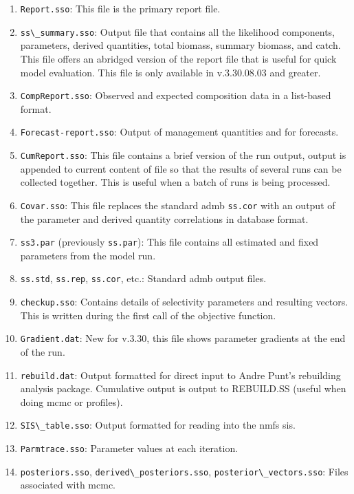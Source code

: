 \begin{enumerate}
		\item \verb|Report.sso|: This file is the primary report file.
		\item \verb|ss\_summary.sso|: Output file that contains all the likelihood components, parameters, derived quantities, total biomass, summary biomass, and catch. This file offers an abridged version of the report file that is useful for quick model evaluation. This file is only available in v.3.30.08.03 and greater.
		\item \verb|CompReport.sso|: Observed and expected composition data in a list-based format.
		\item \verb|Forecast-report.sso|: Output of management quantities and for forecasts.
		\item \verb|CumReport.sso|: This file contains a brief version of the run output, output is appended to current content of file so that the results of several runs can be collected together. This is useful when a batch of runs is being processed.
		\item \verb|Covar.sso|: This file replaces the standard \gls{admb} \verb|ss.cor| with an output of the parameter and derived quantity correlations in database format.
		\item \verb|ss3.par| (previously \verb|ss.par|): This file contains all estimated and fixed parameters from the model run. 
		\item \verb|ss.std|, \verb|ss.rep|, \verb|ss.cor|, etc.: Standard \gls{admb} output files.
		\item \verb|checkup.sso|: Contains details of selectivity parameters and resulting vectors. This is written during the first call of the objective function.
		\item \verb|Gradient.dat|: New for v.3.30, this file shows parameter gradients at the end of the run.
		\item \verb|rebuild.dat|: Output formatted for direct input to Andre Punt's rebuilding analysis package. Cumulative output is output to REBUILD.SS (useful when doing \gls{mcmc} or profiles).
		\item \verb|SIS\_table.sso|: Output formatted for reading into the \gls{nmfs} \gls{sis}.
		\item \verb|Parmtrace.sso|: Parameter values at each iteration.
		\item \verb|posteriors.sso|, \verb|derived\_posteriors.sso|, \verb|posterior\_vectors.sso|: Files associated with \gls{mcmc}.
	\end{enumerate}

